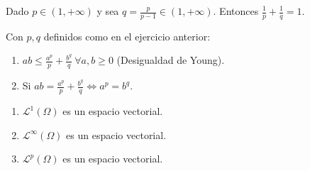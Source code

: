 \begin{ejer}
  Dado $p \in (1, +\infty)$ y sea $q = \frac{p}{p-1} \in (1, +\infty)$. Entonces $\frac{1}{p} + \frac{1}{q} = 1$.
\end{ejer}

\begin{ejer}
  Con $p, q$ definidos como en el ejercicio anterior:
  \begin{enumerate}
  \item $ \displaystyle ab \leq \frac{a^p}{p} + \frac{b^q}{q} \ \forall a, b \geq 0$ (Desigualdad de Young).
  \item Si $ \displaystyle ab = \frac{a^p}{p} + \frac{b^q}{q} \Leftrightarrow a^p = b^q$.
  \end{enumerate}
\end{ejer}

\begin{ejer}
  \begin{enumerate}
  \item $\mathcal L^{1} (\Omega)$ es un espacio vectorial.
  \item $\mathcal L^{\infty} (\Omega)$ es un espacio vectorial.
  \item $\mathcal L^{p} (\Omega)$ es un espacio vectorial.
  \end{enumerate}


\end{ejer}


